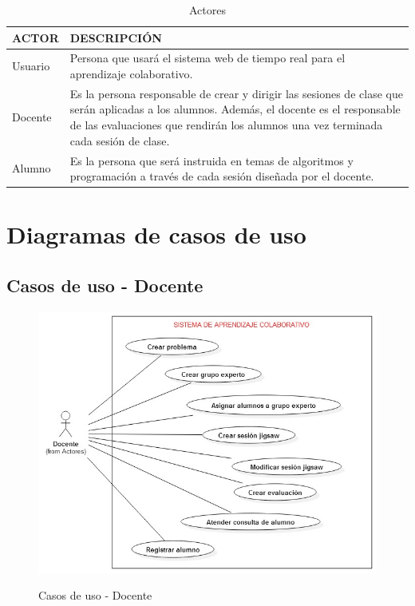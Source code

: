 \begin{longtable}{|L{3cm}|L{7cm}|}
\caption{Actores}
\label{tab:actores}\\
    \hline
    ACTOR & DESCRIPCIÓN \\
    \hline
    Usuario & Persona que usará el sistema web de tiempo real para el aprendizaje colaborativo.\\
    \hline
    Docente & Es la persona responsable de crear y dirigir las sesiones de clase que serán aplicadas a los alumnos. Además, el docente es el responsable de las evaluaciones que rendirán los alumnos una vez terminada cada sesión de clase.\\
    \hline
    Alumno & Es la persona que será instruida en temas de algoritmos y programación a través de cada sesión diseñada por el docente.\\
    \hline
\end{longtable}
\clearpage
\section{Diagramas de casos de uso}
\subsection{Casos de uso - Docente}
\begin{figure}[!h]
  \centering
  \includegraphics[scale=0.6]{figuras/casosdeuso/DCU_Docente.jpg}\\
  \caption[Casos de uso - Docente]{Casos de uso - Docente}
  \label{fig:cus-docente}
\end{figure}
\clearpage
